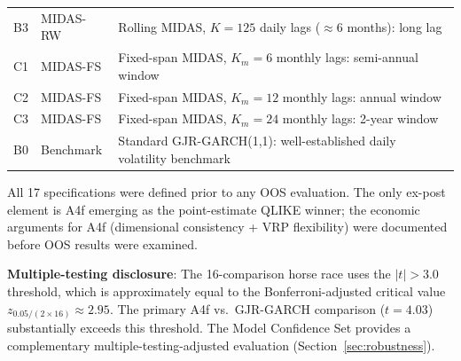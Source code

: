 \documentclass[12pt,a4paper]{article}
\begin{document}
\begin{table}[H]
\begin{threeparttable}
\begin{tabular}{@{}llp{7.5cm}@{}}
B3 & MIDAS-RW & Rolling MIDAS, $K=125$ daily lags ($\approx\!6$ months): long lag \\
C1 & MIDAS-FS & Fixed-span MIDAS, $K_m=6$ monthly lags: semi-annual window \\
C2 & MIDAS-FS & Fixed-span MIDAS, $K_m=12$ monthly lags: annual window \\
C3 & MIDAS-FS & Fixed-span MIDAS, $K_m=24$ monthly lags: 2-year window \\
\midrule
B0 & Benchmark & Standard GJR-GARCH(1,1): well-established daily volatility benchmark \\
\bottomrule
\end{tabular}
\begin{tablenotes}
\footnotesize
\item All 17 specifications were defined prior to any OOS evaluation. The only ex-post element is A4f emerging as the point-estimate QLIKE winner; the economic arguments for A4f (dimensional consistency + VRP flexibility) were documented before OOS results were examined.
\item \textbf{Multiple-testing disclosure}: The 16-comparison horse race uses the \citet{harvey2016} $|t| > 3.0$ threshold, which is approximately equal to the Bonferroni-adjusted critical value $z_{0.05/(2 \times 16)} \approx 2.95$. The primary A4f vs.\ GJR-GARCH comparison ($t = 4.03$) substantially exceeds this threshold. The Model Confidence Set \citep{hansen2011} provides a complementary multiple-testing-adjusted evaluation (Section~\ref{sec:robustness}).
\end{tablenotes}
\end{threeparttable}
\end{table}


\end{document}

